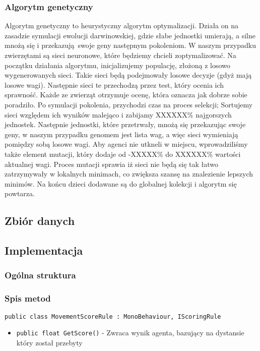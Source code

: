 \documentclass[12pt,a4paper]{article}
\begin{document}
\subsubsection{Algorytm genetyczny}
Algorytm genetyczny to heurystyczny algorytm optymalizacji. Działa on na zasadzie symulacji ewolucji darwinowskiej, gdzie
słabe jednostki umierają, a silne mnożą się i przekazują swoje geny następnym pokoleniom. W naszym przypadku zwierzętami
są sieci neuronowe, które będziemy chcieli zoptymalizować. Na początku działania algorytmu, inicjalizujemy 
populację, złożoną z losowo wygenerowanych sieci. Takie sieci będą podejmowały losowe decyzje (gdyż mają losowe wagi). Następnie sieci te 
przechodzą przez test, który ocenia ich sprawność. Każde ze zwierząt otrzymuje ocenę, która oznacza jak dobrze sobie poradziło.
Po symulacji pokolenia, przychodzi czas na proces selekcji; Sortujemy sieci względem ich wyników malejąco i zabijamy XXXXXX\% najgorszych jednostek.
Następnie jednostki, które przetrwały, mnożą się przekazując swoje geny, w naszym przypadku genomem jest lista wag, a więc sieci wymieniają pomiędzy sobą losowe wagi.
Aby agenci nie utkneli w miejscu, wprowadziliśmy także element mutacji, który dodaje od -XXXXX\% do XXXXXX\% wartości aktualnej wagi.
Proces mutacji sprawia iż sieci nie będą się tak łatwo zatrzymywały w lokalnych minimach, co zwiększa szansę na znalezienie lepszych minimów.
Na końcu dzieci dodawane są do globalnej kolekcji i algorytm się powtarza.






\subsection*{Zbiór danych}




\subsection*{Implementacja}
\subsubsection*{Ogólna struktura}
\subsubsection*{Spis metod}
\lstinline{public class MovementScoreRule : MonoBehaviour, IScoringRule}
\begin{itemize}
    \item \lstinline|public float GetScore()| - Zwraca wynik agenta, bazujący na dystansie który został przebyty
\end{itemize}
\end{document}
